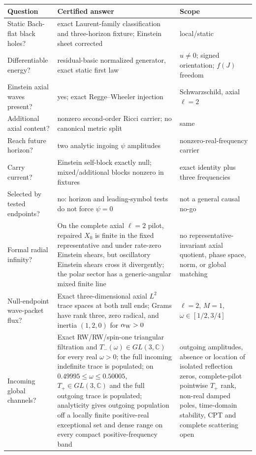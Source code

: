 \documentclass[11pt]{article}
\theoremstyle{definition}
\theoremstyle{remark}
\begin{document}
{\footnotesize
\begin{center}
\begin{tabularx}{0.98\textwidth}{@{}Y Y Y@{}}
\toprule
Question & Certified answer & Scope\\
\midrule
Static Bach-flat black holes? & exact Laurent-family classification and
three-horizon fixture; Einstein sheet corrected & local/static\\
Differentiable energy? & residual-basic normalized generator, exact static
first law & \(u\neq0\); signed orientation; \(f(J)\) freedom\\
Einstein axial waves present? & yes; exact Regge--Wheeler injection &
Schwarzschild, axial $\ell=2$\\
Additional axial content? & nonzero second-order Ricci carrier; no canonical
metric split & same\\
Reach future horizon? & two analytic ingoing \(\psi\) amplitudes &
nonzero-real-frequency carrier\\
Carry current? & Einstein self-block exactly null; mixed/additional blocks
nonzero in fixtures & exact identity plus three frequencies\\
Selected by tested endpoints? & no: horizon and leading-symbol tests do not
force \(\psi=0\) & not a general causal no-go\\
Formal radial infinity? & On the complete axial $\ell=2$ pilot, repaired
$X_0$ is finite in the fixed representative and under rate-zero Einstein
shears, but oscillatory Einstein shears cross it divergently; the polar
sector has a generic-angular mixed finite line & no representative-invariant
axial quotient, phase space, norm, or global matching\\
Null-endpoint wave-packet flux? & Exact three-dimensional axial
$L^2$ trace spaces at both null ends; Grams have rank three, zero radical,
and inertia $(1,2,0)$ for $\alpha_{\rm W}>0$ & $\ell=2$, $M=1$,
$\omega\in[1/2,3/4]$\\
Incoming global channels? & Exact RW/RW/spin-one triangular filtration and
$T_-(\omega)\in GL(3,\mathbb C)$ for every real $\omega>0$; the full
incoming indefinite trace is populated; on
$0.49995\le\omega\le0.50005$, $T_+\in GL(3,\mathbb C)$ and the full
outgoing trace is populated; analyticity gives outgoing population off a
locally finite positive-real exceptional set and dense range on every
compact positive-frequency band &
outgoing amplitudes, absence or location of isolated reflection zeros,
complete-pilot pointwise $T_+$ rank, non-real damped poles,
time-domain stability, CPT and complete scattering open\\

\end{tabularx}
\end{center}}
\end{document}
